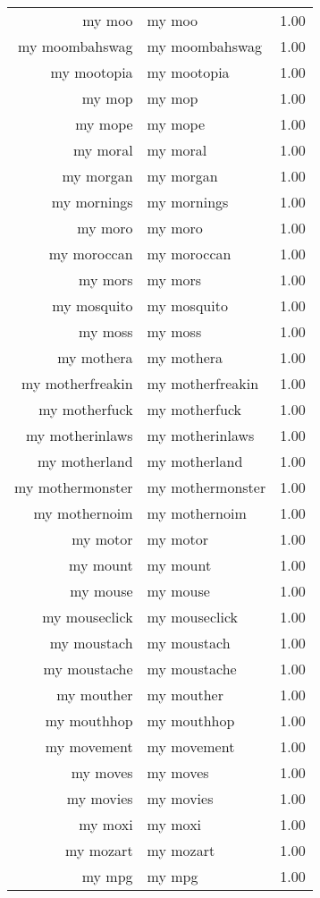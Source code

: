 \begin{table}[ht]
\begin{tabular}{rlr}
  my moo & my moo & 1.00 \\ 
  my moombahswag & my moombahswag & 1.00 \\ 
  my mootopia & my mootopia & 1.00 \\ 
  my mop & my mop & 1.00 \\ 
  my mope & my mope & 1.00 \\ 
  my moral & my moral & 1.00 \\ 
  my morgan & my morgan & 1.00 \\ 
  my mornings & my mornings & 1.00 \\ 
  my moro & my moro & 1.00 \\ 
  my moroccan & my moroccan & 1.00 \\ 
  my mors & my mors & 1.00 \\ 
  my mosquito & my mosquito & 1.00 \\ 
  my moss & my moss & 1.00 \\ 
  my mothera & my mothera & 1.00 \\ 
  my motherfreakin & my motherfreakin & 1.00 \\ 
  my motherfuck & my motherfuck & 1.00 \\ 
  my motherinlaws & my motherinlaws & 1.00 \\ 
  my motherland & my motherland & 1.00 \\ 
  my mothermonster & my mothermonster & 1.00 \\ 
  my mothernoim & my mothernoim & 1.00 \\ 
  my motor & my motor & 1.00 \\ 
  my mount & my mount & 1.00 \\ 
  my mouse & my mouse & 1.00 \\ 
  my mouseclick & my mouseclick & 1.00 \\ 
  my moustach & my moustach & 1.00 \\ 
  my moustache & my moustache & 1.00 \\ 
  my mouther & my mouther & 1.00 \\ 
  my mouthhop & my mouthhop & 1.00 \\ 
  my movement & my movement & 1.00 \\ 
  my moves & my moves & 1.00 \\ 
  my movies & my movies & 1.00 \\ 
  my moxi & my moxi & 1.00 \\ 
  my mozart & my mozart & 1.00 \\ 
  my mpg & my mpg & 1.00 \\ 

\end{tabular}
\end{table}
